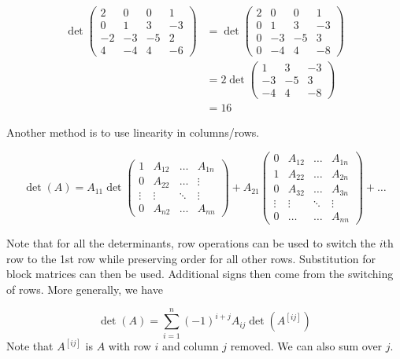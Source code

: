 \documentclass[12pt]{article}
\begin{document}
\begin{ex}
	\begin{align*}
		\det\begin{pmatrix} 2 & 0 & 0 & 1 \\ 0 & 1 & 3 & -3 \\ -2 & -3 & -5 & 2 \\ 4 & -4 & 4 & -6 \end{pmatrix}&= \det\begin{pmatrix} 2 & 0 & 0 & 1 \\ 0 & 1 & 3 & -3 \\ 0 & -3 & -5 & 3 \\ 0 & -4 & 4 & -8\end{pmatrix} \\
				      &= 2\det\begin{pmatrix}1 & 3 & -3 \\ -3 & -5 & 3 \\ -4 & 4 & -8\end{pmatrix} \\
				      &= 16
	\end{align*}
\end{ex}

Another method is to use linearity in columns/rows.

$$\det(A) = A_{11}\det\begin{pmatrix}1 & A_{12} & \dots & A_{1n} \\ 0 & A_{22} & \dots & \vdots \\ \vdots & \vdots & \ddots & \vdots \\ 0 & A_{n2} & \dots & A_{nn}\end{pmatrix} + A_{21} \begin{pmatrix} 0 & A_{12} & \dots & A_{1n} \\ 1 & A_{22} & \dots & A_{2n} \\ 0 & A_{32} & \dots & A_{3n} \\ \vdots & \vdots & \ddots & \vdots \\ 0 & \dots & \dots & A_{nn}\end{pmatrix} + \dots$$

Note that for all the determinants, row operations can be used to switch the $i$th row to the 1st row while preserving order for all other rows. Substitution for block matrices can then be used. Additional signs then come from the switching of rows. More generally, we have

$$\det(A) = \sum_{i=1}^n (-1)^{i+j}A_{ij}\det(A^{[ij]})$$
Note that $A^{[ij]}$ is $A$ with row $i$ and column $j$ removed. We can also sum over $j$.
\end{document}
